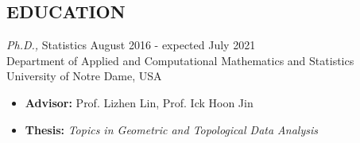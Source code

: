 \documentclass[margin, 10pt]{res} %
\begin{document}
\begin{resume}

% 

%
%

\section{\sf EDUCATION}

{\sl Ph.D.,} Statistics  \hfill August 2016 - expected July 2021\\
Department of Applied and Computational Mathematics and Statistics\\ University of Notre Dame, USA
\begin{itemize} \itemsep -1.0pt %
\item {\bf Advisor:} Prof. Lizhen Lin, Prof. Ick Hoon Jin
\item {\bf Thesis:} \emph{Topics in Geometric and Topological Data Analysis}
\end{itemize}


\end{resume}
\end{document}
